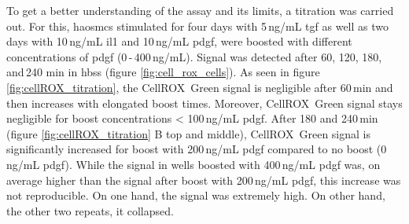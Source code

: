     To get a better understanding of the assay and its limits, a titration was carried out. For this, \acp{haosmc} stimulated for four days with 5\,ng/mL \ac{tgf} as well as two days with 10\,ng/mL \ac{il1} and 10\,ng/mL  \ac{pdgf}, were boosted with different concentrations of \ac{pdgf} (0\,-\,400\,ng/mL). Signal was detected after 60, 120, 180, and\,240 min in \ac{hbss} (figure \ref{fig:cell_rox_cells}). As seen in figure \ref{fig:cellROX_titration}, the CellROX\texttrademark~Green signal is negligible after 60\,min and then increases with elongated boost times. Moreover, CellROX\texttrademark~Green signal stays negligible for boost concentrations < 100\,ng/mL \ac{pdgf}. After 180 and 240\,min (figure \ref{fig:cellROX_titration} B top and middle), CellROX\texttrademark~Green signal is significantly increased for boost with 200\,ng/mL \ac{pdgf} compared to no boost (0\,ng/mL \ac{pdgf}). While the signal in wells boosted with 400\,ng/mL \ac{pdgf} was, on average higher than the signal after boost with 200\,ng/mL \ac{pdgf}, this increase was not reproducible. On one hand, the signal was extremely high. On other hand, the other two repeats, it collapsed.

